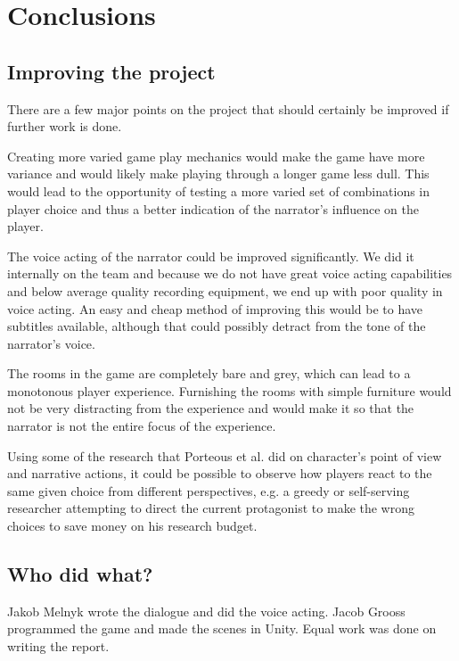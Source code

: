 \section{Conclusions}

\subsection{Improving the project}
There are a few major points on the project that should certainly be improved if further work is done. 

Creating more varied game play mechanics would make the game have more variance and would likely make playing through a longer game less dull. This would lead to the opportunity of testing a more varied set of combinations in player choice and thus a better indication of the narrator's influence on the player.

The voice acting of the narrator could be improved significantly. We did it internally on the team and because we do not have great voice acting capabilities and below average quality recording equipment, we end up with poor quality in voice acting. An easy and cheap method of improving this would be to have subtitles available, although that could possibly detract from the tone of the narrator's voice.

The rooms in the game are completely bare and grey, which can lead to a monotonous player experience. Furnishing the rooms with simple furniture would not be very distracting from the experience and would make it so that the narrator is not the entire focus of the experience.

Using some of the research that Porteous et al. \cite{Por} did on character's point of view and narrative actions, it could be possible to observe how players react to the same given choice from different perspectives, e.g. a greedy or self-serving researcher attempting to direct the current protagonist to make the wrong choices to save money on his research budget.

\subsection{Who did what?}
Jakob Melnyk wrote the dialogue and did the voice acting. Jacob Grooss programmed the game and made the scenes in Unity. Equal work was done on writing the report.